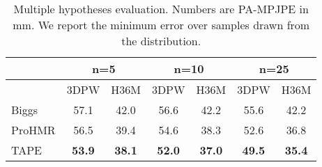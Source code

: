 \documentclass[runningheads]{llncs}
\begin{document}
\begin{table*}[t]
\centering
\begin{adjustbox}{width={0.7\textwidth},totalheight={\textheight},keepaspectratio}

 \centering

\begin{tabular}{|l|cc|cc|cc|}
\hline
        & \multicolumn{2}{c|}{n=5} & \multicolumn{2}{c|}{n=10} & \multicolumn{2}{c|}{n=25} \\ \hline
        & 3DPW        & H36M       & 3DPW        & H36M        & 3DPW        & H36M        \\ \hline
Biggs   & 57.1        & 42.0       & 56.6        & 42.2        & 55.6        & 42.2         \\
ProHMR  & 56.5        & 39.4       & 54.6        & 38.3        & 52.6        & 36.8         \\
TAPE & \textbf{53.9}        & \textbf{38.1}       & \textbf{52.0}        & \textbf{37.0}        & \textbf{49.5}          & \textbf{35.4}         
\\ \hline
\end{tabular}
\end{adjustbox}

\caption{Multiple hypotheses evaluation. Numbers are PA-MPJPE in mm. We report the minimum error over  samples drawn from the distribution.}
\label{samples}
\end{table*}
\end{document}
